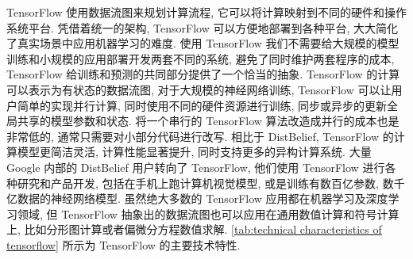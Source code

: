 TensorFlow 使用数据流图来规划计算流程, 它可以将计算映射到不同的硬件和操作系统平台. 凭借着统一的架构, TensorFlow 可以方便地部署到各种平台, 大大简化了真实场景中应用机器学习的难度. 使用 TensorFlow 我们不需要给大规模的模型训练和小规模的应用部署开发两套不同的系统, 避免了同时维护两套程序的成本, TensorFlow 给训练和预测的共同部分提供了一个恰当的抽象. TensorFlow 的计算可以表示为有状态的数据流图, 对于大规模的神经网络训练, TensorFlow 可以让用户简单的实现并行计算, 同时使用不同的硬件资源进行训练, 同步或异步的更新全局共享的模型参数和状态. 将一个串行的 TensorFlow 算法改造成并行的成本也是非常低的, 通常只需要对小部分代码进行改写. 相比于 DistBelief, TensorFlow 的计算模型更简洁灵活, 计算性能显著提升, 同时支持更多的异构计算系统. 大量 Google 内部的 DistBelief 用户转向了 TensorFlow, 他们使用 TensorFlow 进行各种研究和产品开发, 包括在手机上跑计算机视觉模型, 或是训练有数百亿参数, 数千亿数据的神经网络模型. 虽然绝大多数的 TensorFlow 应用都在机器学习及深度学习领域, 但 TensorFlow 抽象出的数据流图也可以应用在通用数值计算和符号计算上, 比如分形图计算或者偏微分方程数值求解. \cref{tab:technical characteristics of tensorflow} 所示为 TensorFlow 的主要技术特性\cite{黄文坚2017tensorflow}.%
%
